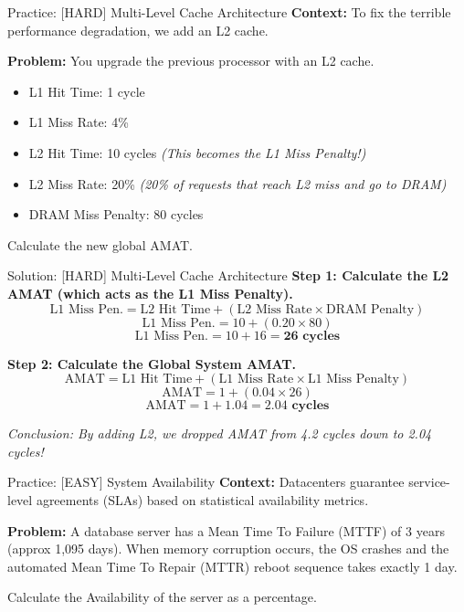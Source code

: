 \documentclass[aspectratio=169]{beamer}
\begin{document}
\begin{frame}{Practice: [HARD] Multi-Level Cache Architecture}
\textbf{Context:} To fix the terrible performance degradation, we add an L2 cache.

\vspace{0.5cm}
\textbf{Problem:} You upgrade the previous processor with an L2 cache.
\begin{itemize}
    \item L1 Hit Time: 1 cycle
    \item L1 Miss Rate: 4\%
    \item L2 Hit Time: 10 cycles \textit{(This becomes the L1 Miss Penalty!)}
    \item L2 Miss Rate: 20\% \textit{(20\% of requests that reach L2 miss and go to DRAM)}
    \item DRAM Miss Penalty: 80 cycles
\end{itemize}

\vspace{0.5cm}
Calculate the new global AMAT.
\end{frame}

\begin{frame}{Solution: [HARD] Multi-Level Cache Architecture}
\textbf{Step 1: Calculate the L2 AMAT (which acts as the L1 Miss Penalty).}
\[ \text{L1 Miss Pen.} = \text{L2 Hit Time} + (\text{L2 Miss Rate} \times \text{DRAM Penalty}) \]
\[ \text{L1 Miss Pen.} = 10 + (0.20 \times 80) \]
\[ \text{L1 Miss Pen.} = 10 + 16 = \mathbf{26 \text{ cycles}} \]

\vspace{0.5cm}
\textbf{Step 2: Calculate the Global System AMAT.}
\[ \text{AMAT} = \text{L1 Hit Time} + (\text{L1 Miss Rate} \times \text{L1 Miss Penalty}) \]
\[ \text{AMAT} = 1 + (0.04 \times 26) \]
\[ \text{AMAT} = 1 + 1.04 = \mathbf{2.04 \text{ cycles}} \]

\vspace{0.5cm}
\textit{Conclusion: By adding L2, we dropped AMAT from 4.2 cycles down to 2.04 cycles!}
\end{frame}

\begin{frame}{Practice: [EASY] System Availability}
\textbf{Context:} Datacenters guarantee service-level agreements (SLAs) based on statistical availability metrics.

\vspace{0.5cm}
\textbf{Problem:} 
A database server has a Mean Time To Failure (MTTF) of 3 years (approx 1,095 days). When memory corruption occurs, the OS crashes and the automated Mean Time To Repair (MTTR) reboot sequence takes exactly 1 day. 

\vspace{0.5cm}
Calculate the Availability of the server as a percentage.
\end{frame}
\end{document}
